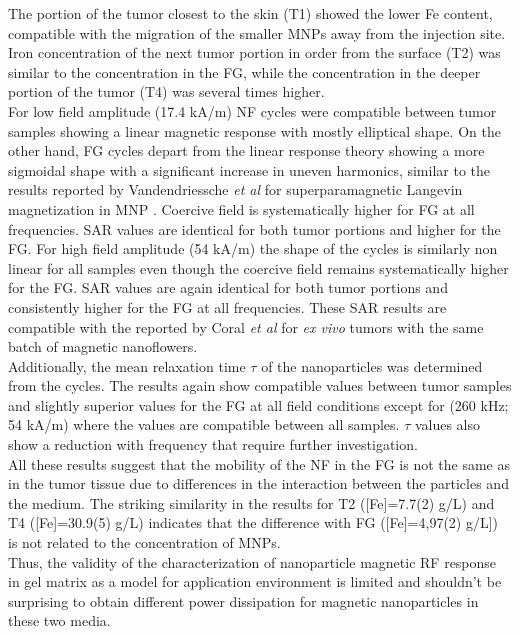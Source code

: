 \documentclass[preprint,12pt]{elsarticle}
\begin{document}
The portion of the tumor closest to the skin (T1) showed  the lower Fe content, compatible with the migration of the smaller MNPs away from the injection site. Iron concentration of the next tumor portion in order from the surface (T2) was similar to the concentration in the FG, while the concentration in the deeper portion of the tumor (T4) was several times higher.\\ 
For low field amplitude (17.4 kA/m) NF cycles were compatible between tumor samples showing a linear magnetic response with mostly elliptical shape. On the other hand, FG cycles depart from the linear response theory showing a more sigmoidal shape with a significant increase in uneven harmonics, similar to the results reported by Vandendriessche \textit{et al} for superparamagnetic Langevin magnetization in MNP \cite{vandendriessche2013magneto}. Coercive field is systematically higher for FG at all frequencies. SAR values are identical for both tumor portions and higher for the FG. For high field amplitude (54 kA/m) the shape of the cycles is similarly non linear for all samples even though the coercive field remains systematically higher for the FG. SAR values are again identical for both tumor portions and consistently higher for the FG at all frequencies. These SAR results are compatible with the reported by Coral \textit{et al} for \textit{ex vivo} tumors with the same batch of magnetic nanoflowers.\cite{coral2018nanoclusters}\\
Additionally, the mean relaxation time $\tau$ of the nanoparticles was determined from the cycles. The results again show compatible values between tumor samples and slightly superior values for the FG at all field conditions except for (260 kHz; 54 kA/m) where the values are compatible between all samples. $\tau$ values also show a reduction with frequency that require further investigation.\\

All these results suggest that the mobility of the NF in the FG is not the same as in the tumor tissue due to differences in the interaction between the particles and the medium. The striking similarity in the results for T2 ([Fe]=7.7(2) g/L) and T4 ([Fe]=30.9(5) g/L) indicates that the difference with FG ([Fe]=4,97(2) g/L]) is not related to the concentration of MNPs.\\ 
Thus, the validity of the characterization of nanoparticle magnetic RF response in gel matrix as a model for application environment is limited and shouldn’t be surprising to obtain different power dissipation for magnetic nanoparticles in these two media.\\ 
\end{document}
